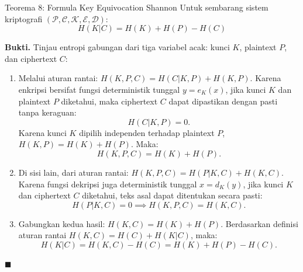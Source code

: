 \documentclass[11pt,a4paper]{article}
\newenvironment{proof}{\noindent\textbf{Bukti.}}{\hfill$\blacksquare$\vspace{0.3em}}
\begin{document}
\begin{thmbox}{Teorema 8: Formula Key Equivocation Shannon}
Untuk sembarang sistem kriptografi $(\mathcal{P}, \mathcal{C}, \mathcal{K}, \mathcal{E}, \mathcal{D})$:
\begin{equation}
\label{eq:key_equivocation}
H(K|C) = H(K) + H(P) - H(C)
\end{equation}
\end{thmbox}
\begin{proof}
Tinjau entropi gabungan dari tiga variabel acak: kunci $K$, plaintext $P$, dan ciphertext $C$:
\begin{enumerate}
    \item Melalui aturan rantai: $H(K, P, C) = H(C|K, P) + H(K, P)$.
    Karena enkripsi bersifat fungsi deterministik tunggal $y = e_K(x)$, jika kunci $K$ dan plaintext $P$ diketahui, maka ciphertext $C$ dapat dipastikan dengan pasti tanpa keraguan:
    \[
    H(C|K, P) = 0.
    \]
    Karena kunci $K$ dipilih independen terhadap plaintext $P$, $H(K, P) = H(K) + H(P)$. Maka:
    \begin{equation}
    \label{eq:proof_hkpc_1}
    H(K, P, C) = H(K) + H(P).
    \end{equation}
    \item Di sisi lain, dari aturan rantai: $H(K, P, C) = H(P|K, C) + H(K, C)$.
    Karena fungsi dekripsi juga deterministik tunggal $x = d_K(y)$, jika kunci $K$ dan ciphertext $C$ diketahui, teks asal dapat ditentukan secara pasti:
    \[
    H(P|K, C) = 0 \implies H(K, P, C) = H(K, C).
    \]
    \item Gabungkan kedua hasil: $H(K, C) = H(K) + H(P)$.
    Berdasarkan definisi aturan rantai $H(K, C) = H(C) + H(K|C)$, maka:
    \[
    H(K|C) = H(K, C) - H(C) = H(K) + H(P) - H(C). 
    \]
\end{enumerate}
\end{proof}
\end{document}

